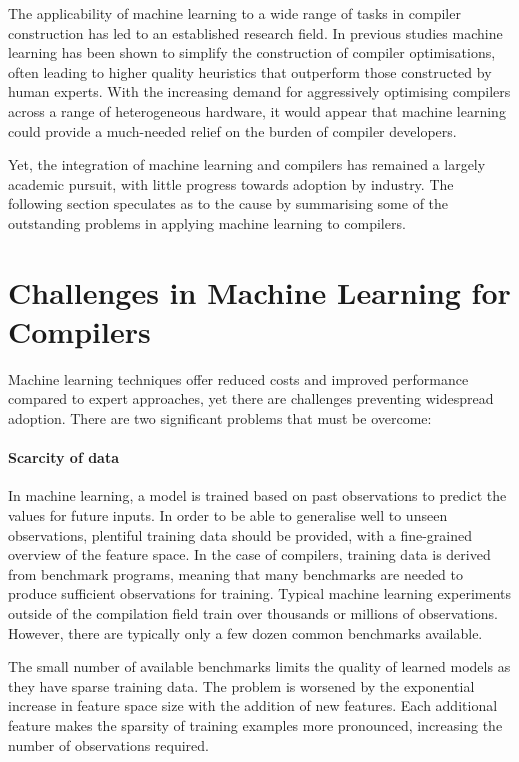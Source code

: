 The applicability of machine learning to a wide range of tasks in compiler construction has led to an established research field. In previous studies machine learning has been shown to simplify the construction of compiler optimisations, often leading to higher quality heuristics that outperform those constructed by human experts. With the increasing demand for aggressively optimising compilers across a range of heterogeneous hardware, it would appear that machine learning could provide a much-needed relief on the burden of compiler developers.

Yet, the integration of machine learning and compilers has remained a largely academic pursuit, with little progress towards adoption by industry. The following section speculates as to the cause by summarising some of the outstanding problems in applying machine learning to compilers.


\section{Challenges in Machine Learning for Compilers}


Machine learning techniques offer reduced costs and improved performance compared to expert approaches, yet there are challenges preventing widespread adoption. There are two significant problems that must be overcome:

\paragraph*{Scarcity of data} In machine learning, a model is trained based on past observations to predict the values for future inputs. In order to be able to generalise well to unseen observations, plentiful training data should be provided, with a fine-grained overview of the feature space. In the case of compilers, training data is derived from benchmark programs, meaning that many benchmarks are needed to produce sufficient observations for training. Typical machine learning experiments outside of the compilation field train over thousands or millions of observations. However, there are typically only a few dozen common benchmarks available.

The small number of available benchmarks limits the quality of learned models as they have sparse training data. The problem is worsened by the exponential increase in feature space size with the addition of new features. Each additional feature makes the sparsity of training examples more pronounced, increasing the number of observations required.

